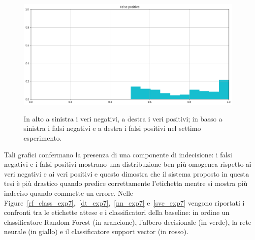 \documentclass[12pt]{report}
\theoremstyle{definition}
\begin{document}
\begin{figure}
   \begin{minipage}{0.48\textwidth}
     \includegraphics[width=\linewidth]{images/experiment_kaggle/fp.png}\label{fp_k}
   \end{minipage}
   \caption{In alto a sinistra i veri negativi, a destra i veri positivi; in basso a sinistra i falsi negativi e a destra i falsi positivi nel settimo esperimento.}
   \label{4cases_exp7}
\end{figure}
Tali grafici confermano la presenza di una componente di indecisione: i falsi negativi e i falsi positivi mostrano una distribuzione ben più omogenea rispetto ai veri negativi e ai veri positivi e questo dimostra che il sistema proposto in questa tesi è più drastico quando predice correttamente l'etichetta mentre si mostra più indeciso quando commette un errore. Nelle Figure~\ref{rf_class_exp7},~\ref{dt_exp7},~\ref{nn_exp7} e~\ref{svc_exp7} vengono riportati i confronti tra le etichette attese e i classificatori della baseline: in ordine un classificatore Random Forest (in arancione), l'albero decisionale (in verde), la rete neurale (in giallo) e il classificatore support vector (in rosso).
\end{document}
